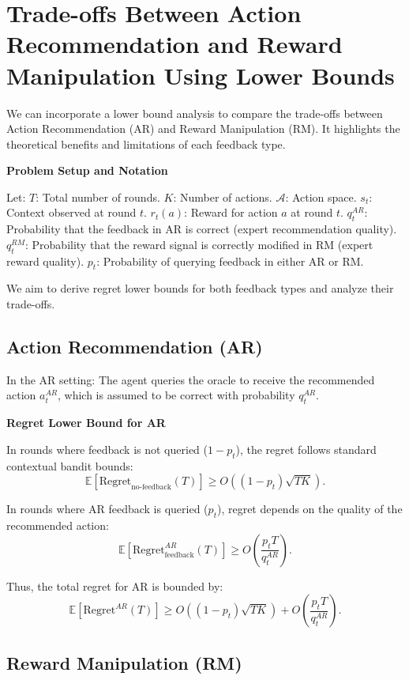 




\section{Trade-offs Between Action Recommendation and Reward Manipulation Using Lower Bounds}
We can incorporate a lower bound analysis to compare the trade-offs between Action Recommendation (AR) and Reward Manipulation (RM). It highlights the theoretical benefits and limitations of each feedback type.


\textbf{Problem Setup and Notation}

Let:
\( T \): Total number of rounds.
\( K \): Number of actions.
\( \mathcal{A} \): Action space.
\( s_t \): Context observed at round \( t \).
\( r_t(a) \): Reward for action \( a \) at round \( t \).
\( q_t^{AR} \): Probability that the feedback in AR is correct (expert recommendation quality).
\( q_t^{RM} \): Probability that the reward signal is correctly modified in RM (expert reward quality).
\( p_t \): Probability of querying feedback in either AR or RM.

We aim to derive regret lower bounds for both feedback types and analyze their trade-offs.


\subsection{Action Recommendation (AR)}

In the AR setting: The agent queries the oracle to receive the recommended action \( a_t^{AR} \), which is assumed to be correct with probability \( q_t^{AR} \).

\textbf{Regret Lower Bound for AR}

In rounds where feedback is not queried (\( 1 - p_t \)), the regret follows standard contextual bandit bounds:
\[
\mathbb{E}[\text{Regret}_{\text{no-feedback}}(T)] \geq O((1 - p_t) \sqrt{T K}).
\]

In rounds where AR feedback is queried (\( p_t \)), regret depends on the quality of the recommended action:
\[
\mathbb{E}[\text{Regret}_{\text{feedback}}^{AR}(T)] \geq O\left(\frac{p_t T}{q_t^{AR}}\right).
\]

Thus, the total regret for AR is bounded by:
\[
\mathbb{E}[\text{Regret}^{AR}(T)] \geq O((1 - p_t) \sqrt{T K}) + O\left(\frac{p_t T}{q_t^{AR}}\right).
\]

\subsection{Reward Manipulation (RM)}

